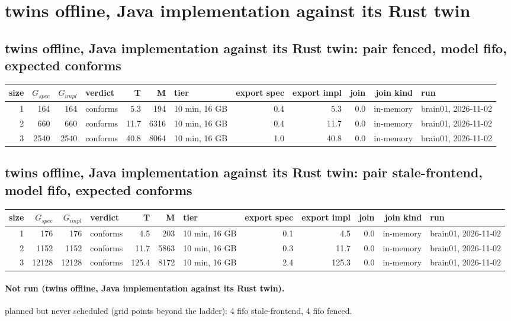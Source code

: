 \documentclass[10pt]{article}
\begin{document}
\section*{twins offline, Java implementation against its Rust twin}
\subsection*{twins offline, Java implementation against its Rust twin: pair \textsf{fenced}, model fifo, expected conforms}
\begin{longtable}{@{}rrrlrrlrrrrl@{}}
\toprule
size & $G_{\mathit{spec}}$ & $G_{\mathit{impl}}$ & verdict & T & M & tier & export spec & export impl & join & join kind & run \\
\midrule
\endhead
\color{red} 1 & 164 & 164 & conforms & 5.3 & 194 & 10 min, 16 GB & 0.4 & 5.3 & 0.0 & in-memory & brain01, 2026-11-02 \\
\color{red} 2 & 660 & 660 & conforms & 11.7 & 6316 & 10 min, 16 GB & 0.4 & 11.7 & 0.0 & in-memory & brain01, 2026-11-02 \\
\color{red} 3 & 2540 & 2540 & conforms & 40.8 & 8064 & 10 min, 16 GB & 1.0 & 40.8 & 0.0 & in-memory & brain01, 2026-11-02 \\
\bottomrule
\end{longtable}
\subsection*{twins offline, Java implementation against its Rust twin: pair \textsf{stale-frontend}, model fifo, expected conforms}
\begin{longtable}{@{}rrrlrrlrrrrl@{}}
\toprule
size & $G_{\mathit{spec}}$ & $G_{\mathit{impl}}$ & verdict & T & M & tier & export spec & export impl & join & join kind & run \\
\midrule
\endhead
\color{red} 1 & 176 & 176 & conforms & 4.5 & 203 & 10 min, 16 GB & 0.1 & 4.5 & 0.0 & in-memory & brain01, 2026-11-02 \\
\color{red} 2 & 1152 & 1152 & conforms & 11.7 & 5863 & 10 min, 16 GB & 0.3 & 11.7 & 0.0 & in-memory & brain01, 2026-11-02 \\
\color{red} 3 & 12128 & 12128 & conforms & 125.4 & 8172 & 10 min, 16 GB & 2.4 & 125.3 & 0.0 & in-memory & brain01, 2026-11-02 \\
\bottomrule
\end{longtable}
\paragraph{Not run (twins offline, Java implementation against its Rust twin).}
planned but never scheduled (grid points beyond the ladder): 4 fifo stale-frontend, 4 fifo fenced.\par
\end{document}
